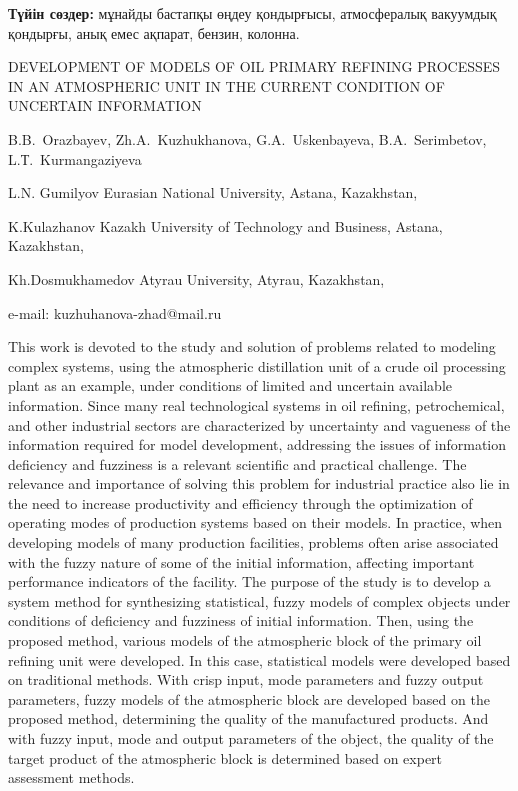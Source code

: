 {\bfseries Түйін сөздер:} мұнайды бастапқы өңдеу қондырғысы, атмосфералық
вакуумдық қондырғы, анық емес ақпарат, бензин, колонна.

\begin{header}
DEVELOPMENT OF MODELS OF OIL PRIMARY REFINING PROCESSES IN AN ATMOSPHERIC UNIT IN THE CURRENT CONDITION OF UNCERTAIN INFORMATION

B.B.~Orazbayev,
Zh.A.~Kuzhukhanova\envelope,
G.A.~Uskenbayeva,
B.A.~Serimbetov,
L.Т.~Kurmangaziyeva
\end{header}

\begin{affil}
L.N. Gumilyov Eurasian National University, Astana, Kazakhstan,

 K.Kulazhanov Kazakh University of Technology and Business, Astana, Kazakhstan,

Kh.Dosmukhamedov Atyrau University, Atyrau, Kazakhstan,

e-mail: kuzhuhanova-zhad@mail.ru
\end{affil}

This work is devoted to the study and solution of problems related to
modeling complex systems, using the atmospheric distillation unit of a
crude oil processing plant as an example, under conditions of limited
and uncertain available information. Since many real technological
systems in oil refining, petrochemical, and other industrial sectors are
characterized by uncertainty and vagueness of the information required
for model development, addressing the issues of information deficiency
and fuzziness is a relevant scientific and practical challenge. The
relevance and importance of solving this problem for industrial practice
also lie in the need to increase productivity and efficiency through the
optimization of operating modes of production systems based on their
models. In practice, when developing models of many production
facilities, problems often arise associated with the fuzzy nature of
some of the initial information, affecting important performance
indicators of the facility. The purpose of the study is to develop a
system method for synthesizing statistical, fuzzy models of complex
objects under conditions of deficiency and fuzziness of initial
information. Then, using the proposed method, various models of the
atmospheric block of the primary oil refining unit were developed. In
this case, statistical models were developed based on traditional
methods. With crisp input, mode parameters and fuzzy output parameters,
fuzzy models of the atmospheric block are developed based on the
proposed method, determining the quality of the manufac\-tured products.
And with fuzzy input, mode and output parameters of the object, the
quality of the target product of the atmospheric block is determined
based on expert assessment methods.


